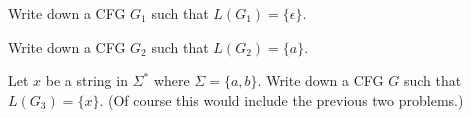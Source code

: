 \begin{tightlist}
\item Write down a CFG $G_1$ such that $L(G_1) = \{ \epsilon \}$.
\item Write down a CFG $G_2$ such that $L(G_2) = \{a\}$.
\item Let $x$ be a string in $\Sigma^*$
where $\Sigma = \{a, b\}$.
Write down a CFG $G$ such that $L(G_3) = \{x\}$.
(Of course this would include the previous two problems.)
\end{tightlist}
